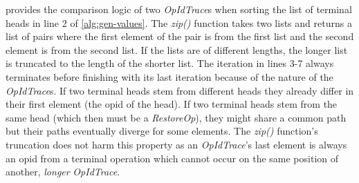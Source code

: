 \documentclass[sigplan,natbib=false,review]{acmart}
\newcommand{\restopkind}{\textit{RestoreOp}}
\newcommand{\opidtrace}{\textit{OpIdTrace}}
\begin{document}
 provides the comparison logic of two \opidtrace{}s
when sorting the list of terminal heads in line 2 of \cref{alg:gen-values}.
The \textit{zip()} function takes two lists and returns a list of pairs
where the first element of the pair is from the first list and the second
element is from the second list.
If the lists are of different lengths, the longer list is truncated to the
length of the shorter list.
The iteration in lines 3-7 always terminates before finishing with
its last iteration because of the nature of the \opidtrace{}s.
If two terminal heads stem from different heads they already differ in their
first element (the \gls*{opid} of the head).
If two terminal heads stem from the same head (which then must be a \restopkind{}),
they might share a common path but their paths eventually diverge for some elements.
The \textit{zip()} function's truncation does not harm this property
as an \opidtrace{}'s last element is always an \gls*{opid} from a terminal operation
which cannot occur on the same position of another, \emph{longer} \opidtrace{}.
\end{document}
